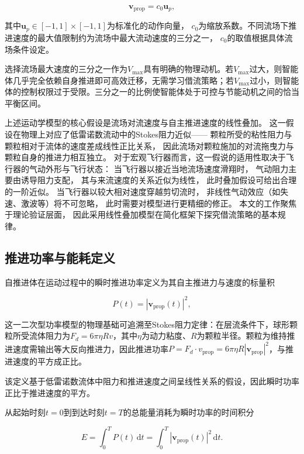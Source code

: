 \begin{equation}
    \mathbf{v}_{\text{prop}} = c_0 \mathbf{u}_p,
    \label{eq:action_standardization}
\end{equation}

其中$\mathbf{u}_p \in [-1, 1] \times [-1, 1]$为标准化的动作向量，
$c_0$为缩放系数。不同流场下推进速度的最大值限制约为流场中最大流动速度的三分之一，
$c_0$的取值根据具体流场条件设定。

选择流场最大速度的三分之一作为$V_{\max}$具有明确的物理动机。若$V_{\max}$过大，则智能体几乎完全依赖自身推进即可高效迁移，无需学习借流策略；若$V_{\max}$过小，则智能体的控制权限过于受限。三分之一的比例使智能体处于可控与节能动机之间的恰当平衡区间。

上述运动学模型的核心假设是流场对流速度与自主推进速度的线性叠加。
这一假设在物理上对应了低雷诺数流动中的Stokes阻力近似——
颗粒所受的粘性阻力与颗粒相对于流体的速度差成线性正比关系，
因此流场对颗粒施加的对流拖曳力与颗粒自身的推进力相互独立。
对于宏观飞行器而言，这一假说的适用性取决于飞行器的气动外形与飞行状态：
当飞行器以接近当地流场速度滑翔时，
气动阻力主要由诱导阻力支配，
其与来流速度的关系近似为线性，
此时叠加假设可给出合理的一阶近似。
当飞行器以较大相对速度穿越剪切流时，
非线性气动效应（如失速、激波等）将不可忽略，
此时需要对模型进行更精细的修正。
本文的工作聚焦于理论验证层面，
因此采用线性叠加模型在简化框架下探究借流策略的基本规律。


\subsection{推进功率与能耗定义}

自推进体在运动过程中的瞬时推进功率定义为其自主推进力与速度的标量积

\begin{equation}
    P(t) = |\mathbf{v}_{\text{prop}}(t)|^2,
    \label{eq:power}
\end{equation}

这一二次型功率模型的物理基础可追溯至Stokes阻力定律：在层流条件下，球形颗粒所受流体阻力为$F_d = 6\pi\eta R v$，其中$\eta$为动力粘度、$R$为颗粒半径。颗粒为维持推进速度需输出等大反向推进力，因此推进功率$P = F_d \cdot v_{\text{prop}} = 6\pi\eta R |\mathbf{v}_{\text{prop}}|^2$，与推进速度的平方成正比。

该定义基于低雷诺数流体中阻力和推进速度之间呈线性关系的假设，因此瞬时功率正比于推进速度的平方。

从起始时刻$t=0$到到达时刻$t=T$的总能量消耗为瞬时功率的时间积分

\begin{equation}
    E = \int_{0}^{T} P(t) \, \mathrm{d}t = \int_{0}^{T} |\mathbf{v}_{\text{prop}}(t)|^2 \, \mathrm{d}t.
    \label{eq:total_energy}
\end{equation}

